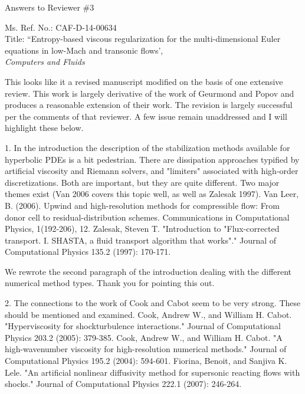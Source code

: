 \documentclass{article}
\begin{document}
\begin{center}
{ \Large Answers to Reviewer \#3}
\end{center}

\bigskip

\noindent Ms. Ref. No.: CAF-D-14-00634\\
Title: ``Entropy-based viscous regularization for the multi-dimensional Euler equations in low-Mach and transonic flows', \\
{\it Computers and Fluids}\\

\bigskip
\bigskip

{
\color{blue}
This looks like it a revised manuscript modified on the basis of one
extensive review.
This work is largely derivative of the work of Geurmond and Popov and
produces a reasonable extension of their work. The revision is largely
successful per the comments of that reviewer. A few issue remain
unaddressed and I will highlight these below.
}

\bigskip

{
\color{blue}
1. In the introduction the description of the stabilization methods
available for hyperbolic PDEs is a bit pedestrian. There are dissipation
approaches typified by artificial viscosity and Riemann solvers, and
"limiters" associated with high-order discretizations. Both are important,
but they are quite different. Two major themes exist (Van 2006 covers
this topic well, as well as Zalesak 1997).
Van Leer, B. (2006). Upwind and high-resolution methods for
compressible flow: From donor cell to residual-distribution schemes.
Communications in Computational Physics, 1(192-206), 12.
Zalesak, Steven T. "Introduction to "Flux-corrected transport. I. SHASTA,
a fluid transport algorithm that works"." Journal of Computational Physics
135.2 (1997): 170-171.}

We rewrote the second paragraph of the introduction dealing with the different numerical method types. Thank you for pointing this out.
\bigskip


{
\color{blue}
2. The connections to the work of Cook and Cabot seem to be very
strong. These should be mentioned and examined.
Cook, Andrew W., and William H. Cabot. "Hyperviscosity for shockturbulence
interactions." Journal of Computational Physics 203.2 (2005):
379-385.
Cook, Andrew W., and William H. Cabot. "A high-wavenumber viscosity
for high-resolution numerical methods." Journal of Computational Physics
195.2 (2004): 594-601.
Fiorina, Benoit, and Sanjiva K. Lele. "An artificial nonlinear diffusivity
method for supersonic reacting flows with shocks." Journal of
Computational Physics 222.1 (2007): 246-264.}
\end{document}
